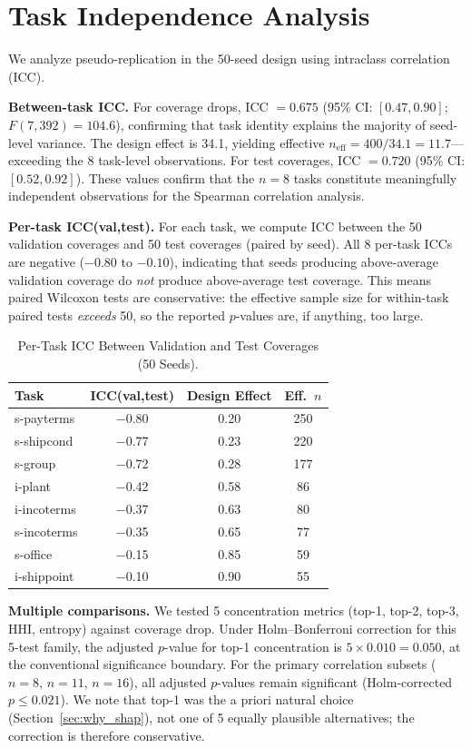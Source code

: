 \documentclass{uai2026} %
\begin{document}
\section{Task Independence Analysis}\label{app:icc}

We analyze pseudo-replication in the 50-seed design using intraclass correlation (ICC).

\textbf{Between-task ICC.} For coverage drops, ICC $= 0.675$ (95\% CI: $[0.47, 0.90]$; $F(7,392)=104.6$), confirming that task identity explains the majority of seed-level variance. The design effect is 34.1, yielding effective $n_{\text{eff}} = 400/34.1 = 11.7$---exceeding the 8 task-level observations. For test coverages, ICC $= 0.720$ (95\% CI: $[0.52, 0.92]$). These values confirm that the $n=8$ tasks constitute meaningfully independent observations for the Spearman correlation analysis.

\textbf{Per-task ICC(val,test).} For each task, we compute ICC between the 50 validation coverages and 50 test coverages (paired by seed). All 8 per-task ICCs are negative ($-0.80$ to $-0.10$), indicating that seeds producing above-average validation coverage do \textit{not} produce above-average test coverage. This means paired Wilcoxon tests are conservative: the effective sample size for within-task paired tests \textit{exceeds} 50, so the reported $p$-values are, if anything, too large.

\begin{table}[htbp]
\centering
\caption{Per-Task ICC Between Validation and Test Coverages (50 Seeds).}\label{tab:per_task_icc}
\small
\begin{tabular}{@{}lccc@{}}
\toprule
Task & ICC(val,test) & Design Effect & Eff.\ $n$ \\
\midrule
s-payterms  & $-$0.80 & 0.20 & 250 \\
s-shipcond  & $-$0.77 & 0.23 & 220 \\
s-group     & $-$0.72 & 0.28 & 177 \\
i-plant     & $-$0.42 & 0.58 & 86 \\
i-incoterms & $-$0.37 & 0.63 & 80 \\
s-incoterms & $-$0.35 & 0.65 & 77 \\
s-office    & $-$0.15 & 0.85 & 59 \\
i-shippoint & $-$0.10 & 0.90 & 55 \\
\bottomrule
\end{tabular}
\end{table}

\textbf{Multiple comparisons.} We tested 5 concentration metrics (top-1, top-2, top-3, HHI, entropy) against coverage drop. Under Holm--Bonferroni correction for this 5-test family, the adjusted $p$-value for top-1 concentration is $5 \times 0.010 = 0.050$, at the conventional significance boundary. For the primary correlation subsets ($n=8$, $n=11$, $n=16$), all adjusted $p$-values remain significant (Holm-corrected $p \leq 0.021$). We note that top-1 was the a priori natural choice (Section~\ref{sec:why_shap}), not one of 5 equally plausible alternatives; the correction is therefore conservative.
\end{document}
